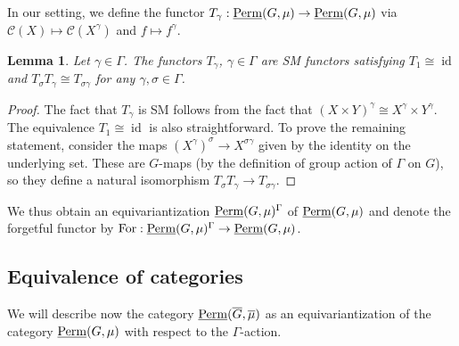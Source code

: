 \documentclass[11pt,a4paper]{amsart}
\theoremstyle{plain}%
\newtheorem{lemma}{Lemma}[subsection]
\theoremstyle{definition}
\theoremstyle{remark}
\newcommand{\id}{\operatorname{id}}
\newcommand{\Perm}{\underline{{\rm Perm}}}
\newcommand{\cC}{\mathcal{C}}
\newcommand{\oG}{{\overline{G}}}
\newcommand{\For}{\operatorname{For}}
\begin{document}
In our setting, we define the functor $T_{\gamma}: \Perm(G,\mu)\to \Perm(G,\mu)$ via $\cC(X)\mapsto \cC(X^{\gamma})$ and $f\mapsto f^{\gamma}$.
\begin{lemma}
Let $\gamma\in \Gamma$. The functors $T_{\gamma}$, $\gamma\in \Gamma$ are SM functors satisfying $T_1\cong \id $ and $T_\sigma T_\gamma \cong T_{\sigma \gamma} $ for any $\gamma, \sigma \in \Gamma$.
\end{lemma}
\begin{proof}
    The fact that $T_{\gamma}$ is SM follows from the fact that $(X\times Y)^\gamma\cong X^\gamma\times Y^\gamma$.
    The equivalence $T_{1}\cong \id $ is also straightforward. To prove the remaining statement, consider the maps $(X^\gamma)^\sigma \to X^{\sigma \gamma}$ given by the identity on the underlying set. These are $G$-maps (by the definition of group action of $\Gamma$ on $G$), so they define a natural isomorphism $T_\sigma T_\gamma \to T_{\sigma \gamma} $.
\end{proof}
We thus obtain an equivariantization $\Perm(G,\mu)^\Gamma$ of $\Perm(G,\mu)$ and denote the forgetful functor by $\For:\Perm(G,\mu)^\Gamma \to \Perm(G,\mu)$.

\subsection{Equivalence of categories}
 We will describe now the category $\Perm(\oG,\overline{\mu})$ as an equivariantization of the category $\Perm(G,{\mu})$ with respect to the $\Gamma$-action.
\end{document}
